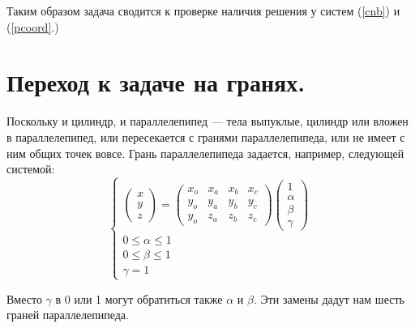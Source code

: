 \documentclass[pdftex,ptm,12pt,a4paper]{report}
\begin{document}
      Таким образом задача сводится к проверке наличия решения у систем (\ref{cnb}) и (\ref{pcoord}.)
\section{Переход к задаче на гранях.}
    Поскольку и цилиндр, и параллелепипед --- тела выпуклые, цилиндр или вложен в параллелепипед, или пересекается с гранями параллелепипеда, или не имеет с ним общих точек вовсе.
    Грань параллелепипеда задается, например, следующей системой:
    \begin{equation}\label{planecoord}
      \begin{cases}
        \begin{pmatrix} x \\ y \\ z \end{pmatrix}            
        =
        \begin{pmatrix} x_o & x_a & x_b & x_c \\ y_o & y_a & y_b & y_c  \\ y_o & z_a & z_b & z_c 
        \end{pmatrix} \begin {pmatrix} 1 \\ \alpha \\ \beta \\ \gamma \end{pmatrix} \\
        0 \le  \alpha   \le  1 \\
        0 \le  \beta   \le  1 \\
        \gamma   =  1 
      \end{cases}
    \end{equation}

    Вместо $\gamma$ в 0 или 1 могут обратиться также $\alpha$ и $\beta$.
    Эти замены дадут нам шесть граней параллелепипеда.
\end{document}

